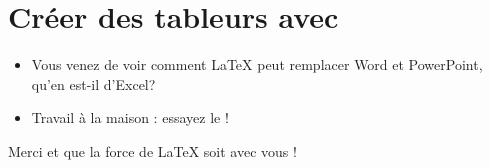 \documentclass{beamer}
\begin{document}
\section{Créer des tableurs avec \protect{}}

\begin{frame}[fragile]{\insertsection}
\begin{itemize}
\item Vous venez de voir comment \LaTeX{} peut remplacer Word et PowerPoint, qu'en est-il d'Excel?
\item Travail à la maison : essayez le  !
\end{itemize}
\end{frame}

\begin{frame}
\begin{center}
Merci et que la force de \LaTeX{} soit avec vous !
\end{center}
\end{frame}
\end{document}
